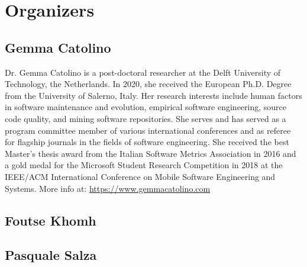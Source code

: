 \section{Organizers}
\label{sec:organizers}
\subsection{Gemma Catolino}
Dr. Gemma Catolino is a post-doctoral researcher at the Delft University of Technology, the Netherlands. In 2020, she received the European Ph.D. Degree from the University of Salerno, Italy. Her research interests include human factors in software maintenance and evolution, empirical software engineering, source code quality, and mining software repositories. She serves and has served as a program committee member of various international conferences and as referee for flagship journals in the fields of software engineering. She received the best Master's thesis award from the Italian Software Metrics Association in 2016 and a gold medal for the Microsoft Student Research Competition in 2018 at the IEEE/ACM International Conference on Mobile Software Engineering and Systems.
More info at: \url{https://www.gemmacatolino.com} \medskip
\subsection{Foutse Khomh}

\subsection{Pasquale Salza}